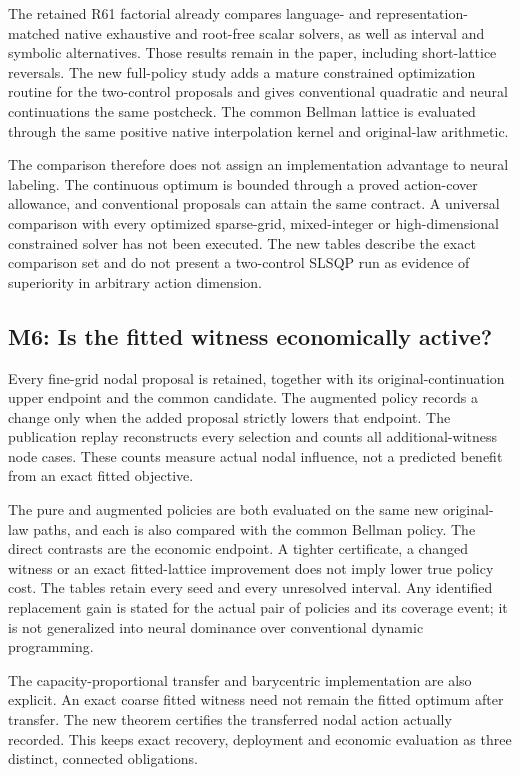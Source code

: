 The retained R61 factorial already compares language- and
representation-matched native exhaustive and root-free scalar solvers,
as well as interval and symbolic alternatives. Those results remain in
the paper, including short-lattice reversals. The new full-policy study
adds a mature constrained optimization routine for the two-control
proposals and gives conventional quadratic and neural continuations the
same postcheck. The common Bellman lattice is evaluated through the same
positive native interpolation kernel and original-law arithmetic.

The comparison therefore does not assign an implementation advantage to
neural labeling. The continuous optimum is bounded through a proved
action-cover allowance, and conventional proposals can attain the same
contract. A universal comparison with every optimized sparse-grid,
mixed-integer or high-dimensional constrained solver has not been
executed. The new tables describe the exact comparison set and do not
present a two-control SLSQP run as evidence of superiority in arbitrary
action dimension.

\hypertarget{m6-is-the-fitted-witness-economically-active}{%
\subsection{M6: Is the fitted witness economically
active?}\label{m6-is-the-fitted-witness-economically-active}}

Every fine-grid nodal proposal is retained, together with its
original-continuation upper endpoint and the common candidate. The
augmented policy records a change only when the added proposal strictly
lowers that endpoint. The publication replay reconstructs every
selection and counts all additional-witness node cases. These counts
measure actual nodal influence, not a predicted benefit from an exact
fitted objective.

The pure and augmented policies are both evaluated on the same new
original-law paths, and each is also compared with the common Bellman
policy. The direct contrasts are the economic endpoint. A tighter
certificate, a changed witness or an exact fitted-lattice improvement
does not imply lower true policy cost. The tables retain every seed and
every unresolved interval. Any identified replacement gain is stated for
the actual pair of policies and its coverage event; it is not
generalized into neural dominance over conventional dynamic programming.

The capacity-proportional transfer and barycentric implementation are
also explicit. An exact coarse fitted witness need not remain the fitted
optimum after transfer. The new theorem certifies the transferred nodal
action actually recorded. This keeps exact recovery, deployment and
economic evaluation as three distinct, connected obligations.

